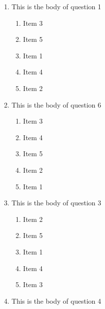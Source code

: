 \documentclass[amsfonts,bezier,leqno,fleqn,12pt,a4paper]{article}
\begin{document}
{{{{\begin{large}
\begin{enumerate}
\begin{enumerate}
\item  Item 1
\item  Item 4
\item  Item 3
\item  Item 2
\item  Item 5

\end{enumerate}
\newpage


\item This is the body of question 1
\vspace {0.3in}
\setcounter{equation}{0}

\begin{enumerate}
\item  Item 3
\item  Item 5
\item  Item 1
\item  Item 4
\item  Item 2

\end{enumerate}

\vspace {3.5cm}


\item This is the body of question 6
\vspace {0.3in}
\setcounter{equation}{0}

\begin{enumerate}
\item  Item 3
\item  Item 4
\item  Item 5
\item  Item 2
\item  Item 1

\end{enumerate}
\newpage


\item This is the body of question 3
\vspace {0.3in}
\setcounter{equation}{0}

\begin{enumerate}
\item  Item 2
\item  Item 5
\item  Item 1
\item  Item 4
\item  Item 3

\end{enumerate}

\vspace {3.5cm}


\item This is the body of question 4
\vspace {0.3in}
\setcounter{equation}{0}


\end{enumerate}
\end{large}}}}}
\end{document}
